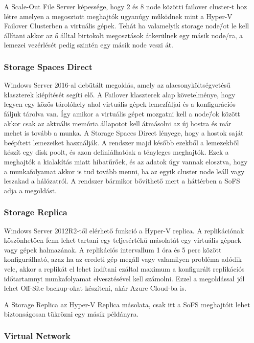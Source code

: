 \documentclass[12pt,oneside,justify,table]{book}
\begin{document}
A Scale-Out File Server képessége, hogy 2 és 8 node közötti failover cluster-t hoz létre amelyen a megosztott meghajtók ugyanúgy működnek mint a Hyper-V Failover Clusterben a virtuális gépek. Tehát ha valamelyik storage node\=/ot le kell állítani akkor az ő álltal birtokolt megosztások átkerülnek egy másik node\=/ra, a lemezei vezérlését pedig szintén egy másik node veszi át.

\subsubsection{Storage Spaces Direct}

Windows Server 2016-al debütált megoldás, amely az alacsonyköltségvetésű klaszterek kiépítését segíti elő. A Failover klaszterek alap követelménye, hogy legyen egy közös tárolóhely ahol virtuális gépek lemezfáljai és a konfigurációs fáljuk tárolva van. Így amikor a virtuális gépet mozgatni kell a node\=/ok között akkor csak az aktuális memória állapotot kell átmásolni az új hostra és már mehet is tovább a munka. 
A Storage Spaces Direct lényege, hogy a hostok saját beépített lemezeiket használják. A rendszer majd később ezekből a lemezekből készít egy disk poolt, és azon definiálhatóak a tényleges meghajtók. Ezek a meghajtók a kialakítás miatt hibatűrőek, és az adatok úgy vannak elosztva, hogy a munkafolyamat akkor is tud tovább menni, ha az egyik cluster node leáll vagy leszakad a hálózatról.
A rendszer bármikor bővíthető mert a háttérben a SoFS adja a megoldást.

\subsubsection{Storage Replica}

Windows Server 2012R2-től elérhető funkció a Hyper-V replica. A replikációnak köszönhetően fenn lehet tartani egy teljesértékű másolatát egy virtuális gépnek vagy gépek halmazának. A replikációs intervallum 1 óra és 5 perc között konfigurálható, azaz ha az eredeti gép megáll vagy valamilyen probléma adódik vele, akkor a replikát el lehet indítani ezáltal maximum a konfigurált replikációs időtartamnyi munkafolyamat elvesztésével kell számolni. Ezzel a megoldással jól lehet Off-Site backup-okat készíteni, akár Azure Cloud-ba is.

A Storage Replica az Hyper-V Replica másolata, csak itt a SoFS meghajtóit lehet biztonságosan tükrözni egy másik példányra.

\subsubsection{Virtual Network}
\end{document}
